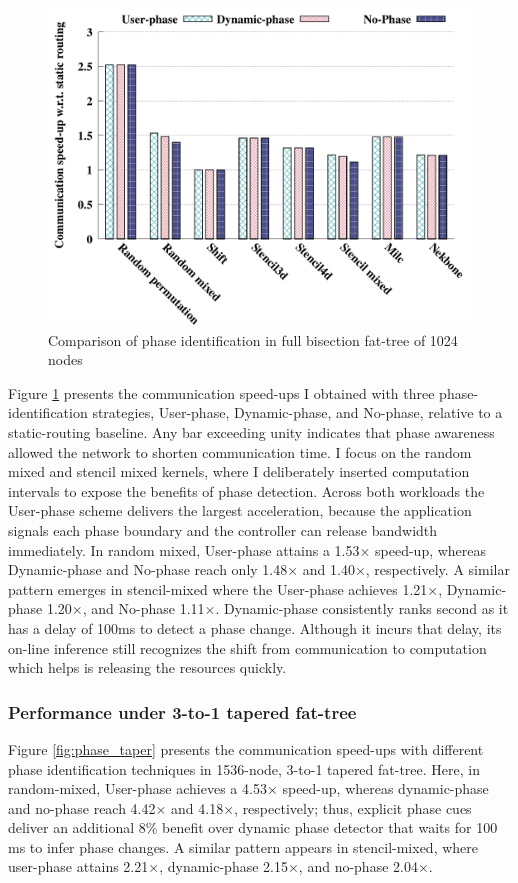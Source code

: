 \begin{figure}[h]
  \centering
  \includegraphics[width=\columnwidth]{./figs_4/phase_full.pdf}
  \caption{Comparison of phase identification in full bisection fat-tree of 1024 nodes}
  \label{fig:phase_full}
\end{figure}
Figure \ref{fig:phase_full} presents the communication speed-ups I obtained with three phase-identification strategies, User-phase, Dynamic-phase, and No-phase, relative to a static-routing baseline. 
Any bar exceeding unity indicates that phase awareness allowed the network to shorten communication time. 
I focus on the random mixed and stencil mixed kernels, where I deliberately inserted computation intervals to expose the benefits of phase detection. Across both workloads the User-phase scheme delivers the largest acceleration, because the application signals each phase boundary and the controller can release bandwidth immediately. 
In random mixed, User-phase attains a 1.53× speed-up, whereas Dynamic-phase and No-phase reach only 1.48× and 1.40×, respectively. A similar pattern emerges in stencil-mixed where the User-phase achieves 1.21×, Dynamic-phase 1.20×, and No-phase 1.11×. Dynamic-phase consistently ranks second as it has a delay of 100ms to detect a phase change. Although it incurs that delay, its on-line inference still recognizes the shift from communication to computation which helps is releasing the resources quickly. 

\subsubsection{Performance under 3-to-1 tapered fat-tree}
Figure \ref{fig:phase_taper} presents the communication speed-ups with different phase identification techniques in 1536-node, 3-to-1 tapered fat-tree. Here, in random-mixed, User-phase achieves a 4.53× speed-up, whereas dynamic-phase and no-phase reach 4.42× and 4.18×, respectively; thus, explicit phase cues deliver an additional 8\% benefit over dynamic phase detector that waits for 100 ms to infer phase changes. A similar pattern appears in stencil-mixed, where user-phase attains 2.21×, dynamic-phase 2.15×, and no-phase 2.04×. 

